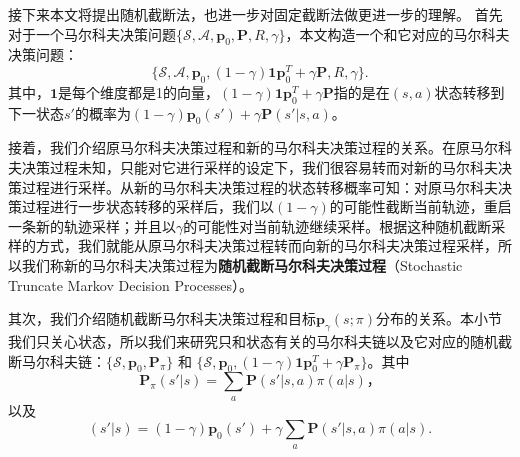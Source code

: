 接下来本文将提出随机截断法，也进一步对固定截断法做更进一步的理解。
首先对于一个马尔科夫决策问题$\{\mathcal{S}, \mathcal{A}, \mathbf{p}_0, \mathbf{P}, R, \gamma\}$，本文构造一个和它对应的马尔科夫决策问题：
\begin{equation}
    \{\mathcal{S}, \mathcal{A}, \mathbf{p}_0, (1 - \gamma)\mathbf{1}\mathbf{p}^T_0 + \gamma\mathbf{P}, R, \gamma\}.
\end{equation}
其中，$\mathbf{1}$是每个维度都是1的向量，$(1 - \gamma)\mathbf{1}\mathbf{p}^T_0 + \gamma\mathbf{P}$指的是在$(s, a)$状态转移到下一状态$s'$的概率为$(1 - \gamma)\mathbf{p}_0(s') + \gamma \mathbf{P}(s' \vert s, a)$。

接着，我们介绍原马尔科夫决策过程和新的马尔科夫决策过程的关系。在原马尔科夫决策过程未知，只能对它进行采样的设定下，我们很容易转而对新的马尔科夫决策过程进行采样。从新的马尔科夫决策过程的状态转移概率可知：对原马尔科夫决策过程进行一步状态转移的采样后，我们以$(1 - \gamma)$的可能性截断当前轨迹，重启一条新的轨迹采样；并且以$\gamma$的可能性对当前轨迹继续采样。根据这种随机截断采样的方式，我们就能从原马尔科夫决策过程转而向新的马尔科夫决策过程采样，所以我们称新的马尔科夫决策过程为\textbf{随机截断马尔科夫决策过程}（Stochastic Truncate Markov Decision Processes）。

其次，我们介绍随机截断马尔科夫决策过程和目标$\mathbf{p}_{\gamma}(s; \pi)$分布的关系。本小节我们只关心状态，所以我们来研究只和状态有关的马尔科夫链以及它对应的随机截断马尔科夫链：$\{\mathcal{S}, \mathbf{p}_0, \mathbf{P}_{\pi}\}$ 和 $\{\mathcal{S}, \mathbf{p}_0, (1-\gamma)\mathbf{1}\mathbf{p}^T_0 + \gamma\mathbf{P}_{\pi}\}$。其中
\begin{equation}
    \mathbf{P}_{\pi}(s' \vert s) = \sum_a \mathbf{P}(s' \vert s, a) \pi(a \vert s)，
\end{equation}
以及
\begin{equation}
    [(1-\gamma)\mathbf{1}\mathbf{p}^T_0 + \gamma\mathbf{P}_{\pi}](s' \vert s) = (1 - \gamma)\mathbf{p}_0(s') + \gamma \sum_a \mathbf{P}(s' \vert s, a) \pi(a \vert s).
\end{equation}

